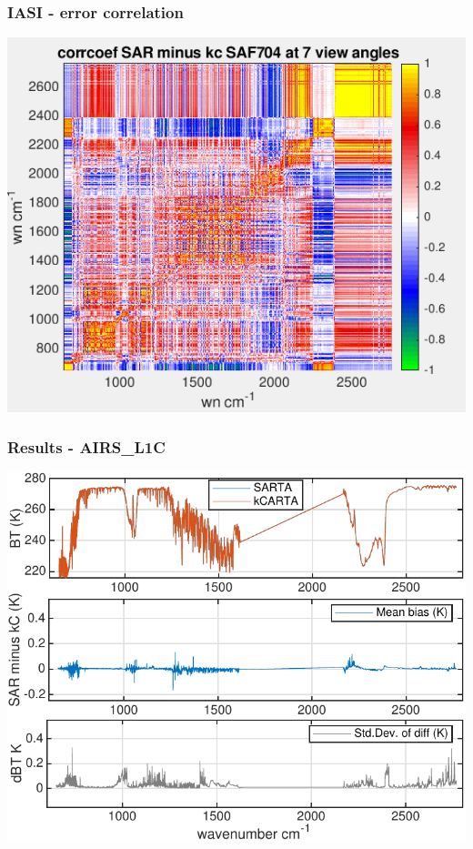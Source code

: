 \documentclass[10pt,t]{beamer}
\begin{document}
\begin{frame}
  \frametitle{IASI - error correlation}
  \begin{center}
    \includegraphics[width=0.9\linewidth]{./Figs/Png/plot1.png}
  \end{center}
      
 \end{frame}

\begin{frame}
  \frametitle{Results - AIRS\_L1C}
  \begin{center}
    \includegraphics[width=0.9\linewidth]{./Figs/Pdf/kc_sar_airs_l1c_mean_bias_stdv_sea_6angs_aslp.pdf}
  \end{center}
      
 \end{frame}
\end{document}
